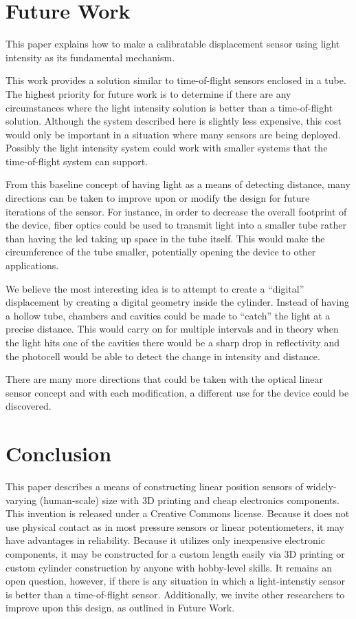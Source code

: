 \documentclass[10pt,conference,compsocconf]{IEEEtran}
\begin{document}
\section{Future Work}

This paper explains how to make a calibratable displacement sensor
using light intensity as its fundamental mechanism.

This work provides a solution similar to time-of-flight\cite{TimeOfFlight} sensors enclosed in
a tube. The highest priority for future work is to determine if there are any circumstances
where the light intensity solution is better than a time-of-flight solution.
Although the system described here is slightly less expensive, this cost would only
be important in a situation where many sensors are being deployed. Possibly the light intensity
system could work with smaller systems that the time-of-flight system can support.


From this baseline concept of having light as a means of detecting
distance, many directions can be taken to improve upon or modify the
design for future iterations of the sensor. For instance, in order to
decrease the overall footprint of the device, fiber optics could be
used to transmit light into a smaller tube rather than having the led
taking up space in the tube itself. This would make the circumference
of the tube smaller, potentially opening the device to other
applications.

We believe the most interesting idea is to attempt to
create a “digital” displacement 
by creating a digital geometry inside the cylinder.
Instead of having a hollow tube,
chambers and cavities could be made to “catch” the light at a precise
distance. This would carry on for multiple intervals and in theory
when the light hits one of the cavities there would be a sharp drop in
reflectivity and the photocell would be able to detect the change in
intensity and distance.

There are many more directions that could be taken with the optical
linear sensor concept and with each modification, a different use for
the device could be discovered.


\section{Conclusion}

This paper describes a means of constructing linear position sensors
of widely-varying (human-scale) size with 3D printing and cheap
electronics components. This invention is released under a Creative
Commons license. Because it does not use physical contact as in most
pressure sensors or linear potentiometers, it may have advantages in
reliability. Because it utilizes only inexpensive electronic
components, it may be constructed for a custom length easily via 3D
printing or custom cylinder construction by anyone with hobby-level
skills. It remains an open question, however, if there is any
situation in which a light-intenstiy sensor is better than a time-of-flight sensor.
Additionally, we invite other researchers to improve upon this
design, as outlined in Future Work.
\end{document}
